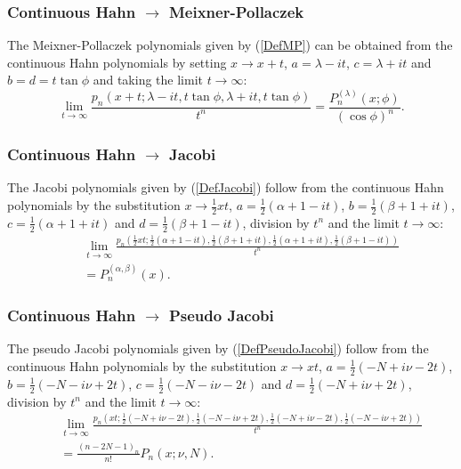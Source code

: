 \documentclass[envcountchap,graybox]{svmono}
\newcounter{rom}
\begin{document}
\subsubsection*{Continuous Hahn $\rightarrow$ Meixner-Pollaczek}
The Meixner-Pollaczek polynomials given by (\ref{DefMP}) can be obtained from the
continuous Hahn polynomials by setting $x\rightarrow x+t$, $a=\lambda-it$, $c=\lambda+it$
and $b=d=t\tan\phi$ and taking the limit $t\rightarrow\infty$:
\begin{equation}
\lim_{t\rightarrow\infty}\frac{p_n(x+t;\lambda-it,t\tan\phi,\lambda+it,t\tan\phi)}{t^n}
=\frac{P_n^{(\lambda)}(x;\phi)}{(\cos\phi)^n}.
\end{equation}

\subsubsection*{Continuous Hahn $\rightarrow$ Jacobi}
The Jacobi polynomials given by (\ref{DefJacobi}) follow from the continuous Hahn polynomials
by the substitution $x\rightarrow \frac{1}{2}xt$, $a=\frac{1}{2}(\alpha+1-it)$,
$b=\frac{1}{2}(\beta+1+it)$, $c=\frac{1}{2}(\alpha+1+it)$ and $d=\frac{1}{2}(\beta+1-it)$,
division by $t^n$ and the limit $t\rightarrow\infty$:
\begin{eqnarray}
& &\lim_{t\rightarrow\infty}
\frac{p_n(\frac{1}{2}xt;\frac{1}{2}(\alpha+1-it),\frac{1}{2}(\beta+1+it),
\frac{1}{2}(\alpha+1+it),\frac{1}{2}(\beta+1-it))}{t^n}\nonumber\\
& &{}=P_n^{(\alpha,\beta)}(x).
\end{eqnarray}

\subsubsection*{Continuous Hahn $\rightarrow$ Pseudo Jacobi}
The pseudo Jacobi polynomials given by (\ref{DefPseudoJacobi}) follow from the continuous
Hahn polynomials by the substitution $x\rightarrow xt$, $a=\frac{1}{2}(-N+i\nu-2t)$,
$b=\frac{1}{2}(-N-i\nu+2t)$, $c=\frac{1}{2}(-N-i\nu-2t)$ and $d=\frac{1}{2}(-N+i\nu+2t)$,
division by $t^n$ and the limit $t\rightarrow\infty$:
\begin{eqnarray}
& &\lim_{t\rightarrow\infty}\frac{p_n(xt;\frac{1}{2}(-N+i\nu-2t),\frac{1}{2}(-N-i\nu+2t),
\frac{1}{2}(-N+i\nu-2t),\frac{1}{2}(-N-i\nu+2t))}{t^n}\nonumber\\
& &{}=\frac{(n-2N-1)_n}{n!}P_n(x;\nu,N).
\end{eqnarray}
\end{document}
